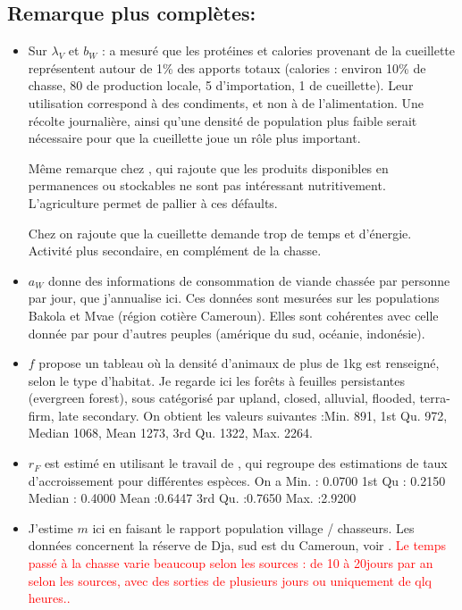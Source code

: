 \documentclass{article}
\newcommand{\lvw}{\lambda_{V}}
\newcommand{\marc}[1]{\textcolor{red}{#1}}
\begin{document}
\subsection{Remarque plus complètes:}
\begin{itemize}
\item Sur $\lvw$ et $b_W$ : \cite{koppert_consommation_1996} a mesuré que les protéines et calories provenant de la cueillette représentent autour de 1\% des apports totaux (calories : environ 10\% de chasse, 80 de production locale, 5 d'importation, 1 de cueillette). Leur utilisation correspond à des condiments, et non à de l'alimentation. Une récolte journalière, ainsi qu'une densité de population plus faible serait nécessaire pour que la cueillette joue un rôle plus important.

Même remarque chez \cite{loung_pygmees_1996}, qui rajoute que les produits disponibles en permanences ou stockables ne sont pas intéressant nutritivement.
L'agriculture permet de pallier à ces défaults.

Chez \cite{bennett_carrying_2000} on rajoute que la cueillette demande trop de temps et d'énergie. Activité plus secondaire, en complément de la chasse.

\item $a_W$ \cite{koppert_consommation_1996} donne des informations de consommation de viande chassée par personne par jour, que j'annualise ici. Ces données sont mesurées sur les populations Bakola et Mvae (région cotière Cameroun). Elles sont cohérentes avec celle donnée par \cite{bennett_carrying_2000} pour d'autres peuples (amérique du sud, océanie, indonésie).

\item $f$ \cite{bennett_carrying_2000} propose un tableau où la densité d'animaux de plus de 1kg est renseigné, selon le type d'habitat. Je regarde ici les forêts à feuilles persistantes (evergreen forest), sous catégorisé par upland, closed, alluvial, flooded, terra-firm, late secondary. On obtient les valeurs suivantes :Min. 891, 1st Qu. 972,  Median 1068,    Mean 1273, 3rd Qu. 1322,   Max. 2264.

\item $r_F$ est estimé en utilisant le travail de \cite{bennett_carrying_2000}, qui regroupe des estimations de taux d'accroissement pour différentes espèces. On a 
 Min. : 0.0700 1st Qu : 0.2150  Median : 0.4000    Mean :0.6447 3rd Qu. :0.7650   Max. :2.9200 
 
\item J'estime $m$ ici en faisant le rapport population village / chasseurs. Les données concernent la réserve de Dja, sud est du Cameroun, voir \cite{avila_interpreting_2019}.
\marc{Le temps passé à la chasse varie beaucoup selon les sources : de 10 à 20jours par an selon les sources, avec des sorties de plusieurs jours ou uniquement de qlq heures..}


\end{itemize}
\end{document}
